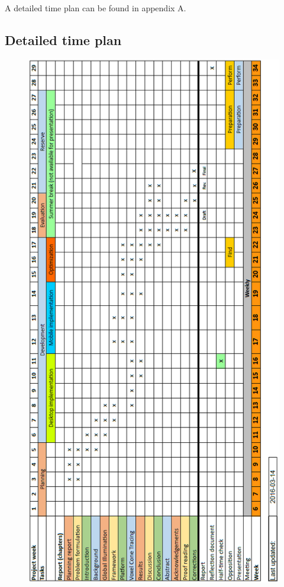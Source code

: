 \documentclass[a4paper, 12pt]{article}
\begin{document}
A detailed time plan can be found in appendix A\@.

\begin{refsection}
\nocite{*}
\printbibliography[heading=bibnumbered, title={Literature Base}, subtype=litbase, prefixnumbers={LB}]
\end{refsection}

\printbibliography[heading=bibnumbered]

\newpage

\begin{appendices}

\section{Detailed time plan}
\label{app:timeplan}

\begin{figure}[!hb]
    \centering
    \includegraphics[scale=0.5]{images/timeplan.png}

\end{figure}
\end{appendices}
\end{document}
